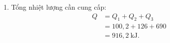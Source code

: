 \begin{bt}
{\begin{enumerate}
\[			\]
			Nhiệt lượng cần cho giai đoạn hóa hơi hoàn toàn:
			\[
			\begin{aligned}
				Q_3 &= mL \\
				&= 0{,}3 \cdot 2{,}3 \cdot 10^6 \\
				&= 690\,000\ \mathrm{J} = 690\ \mathrm{kJ}.
			\end{aligned}
			\]
			\item Tổng nhiệt lượng cần cung cấp:
			\[
			\begin{aligned}
				Q &= Q_1 + Q_2 + Q_3 \\
				&= 100{,}2 + 126 + 690 \\
				&= 916{,}2\ \mathrm{kJ}.
			\end{aligned}
			\]
		\end{enumerate}
	}
\end{bt}

